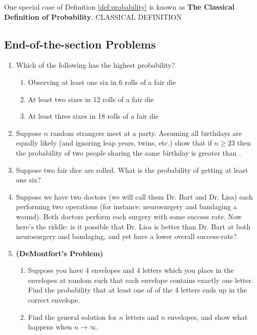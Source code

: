 \documentclass{report}
\begin{document}
One special case of Definition \ref{def:probability} is known as \textbf{The Classical Definition of Probability}. \todo CLASSICAL DEFINITION

\subsection*{End-of-the-section Problems}\label{sec:problaw_eosp}

\begin{enumerate}
    \item Which of the following has the highest probability?
    \begin{enumerate}
        \item Observing at least one six in 6 rolls of a fair die
        \item At least two sixes in 12 rolls of a fair die
        \item At least three sixes in 18 rolls of a fair die
    \end{enumerate}
    \item Suppose $n$ random strangers meet at a party. Assuming all birthdays are equally likely (and ignoring leap years, twins, etc.) show that if $n\ge 23$ then the probability of two people sharing the same birthday is greater than .
    \item Suppose two fair dice are rolled. What is the probability of getting at least one six?
    \item Suppose we have two doctors (we will call them Dr. Bart and Dr. Lisa) each performing two operations (for instance: neurosurgery and bandaging a wound). Both doctors perform each surgery with some success rate. Now here's the riddle: is it possible that Dr. Lisa is better than Dr. Bart at both neurosurgery and bandaging, and yet have a lower overall success-rate?
    \item \textbf{(DeMontfort's Problem)} 
    \begin{enumerate}
        \item Suppose you have 4 envelopes and 4 letters which you place in the envelopes at random such that each envelope contains exactly one letter. Find the probability that at least one of of the 4 letters ends up in the correct envelope.
        \item Find the general solution for $n$ letters and $n$ envelopes, and show what happens when $n\to\infty$.
        
    \end{enumerate}
\end{enumerate}
\end{document}
